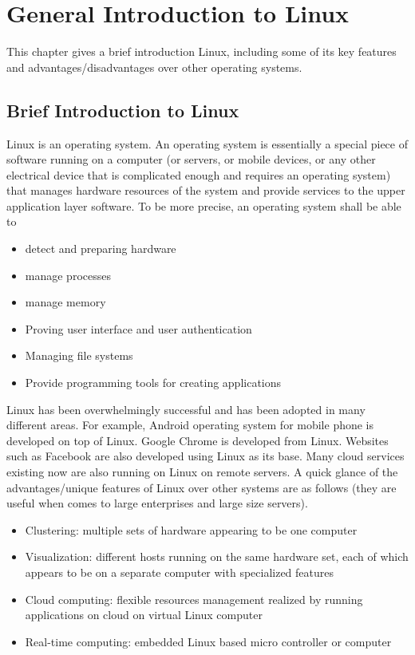 \chapter{General Introduction to Linux}

This chapter gives a brief introduction Linux, including some of its key features and advantages/disadvantages over other operating systems.

\section{Brief Introduction to Linux}

Linux is an operating system. An operating system is essentially a special piece of software running on a computer (or servers, or mobile devices, or any other electrical device that is complicated enough and requires an operating system) that manages hardware resources of the system and provide services to the upper application layer software. To be more precise, an operating system shall be able to
\begin{itemize}
  \item detect and preparing hardware
  \item manage processes
  \item manage memory
  \item Proving user interface and user authentication
  \item Managing file systems
  \item Provide programming tools for creating applications
\end{itemize}

Linux has been overwhelmingly successful and has been adopted in many different areas. For example, Android operating system for mobile phone is developed on top of Linux. Google Chrome is developed from Linux. Websites such as Facebook are also developed using Linux as its base. Many cloud services existing now are also running on Linux on remote servers. A quick glance of the advantages/unique features of Linux over other systems are as follows (they are useful when comes to large enterprises and large size servers).
\begin{itemize}
  \item Clustering: multiple sets of hardware appearing to be one computer
  \item Visualization: different hosts running on the same hardware set, each of which appears to be on a separate computer with specialized features
  \item Cloud computing: flexible resources management realized by running applications on cloud on virtual Linux computer
  \item Real-time computing: embedded Linux based micro controller or computer
\end{itemize}

